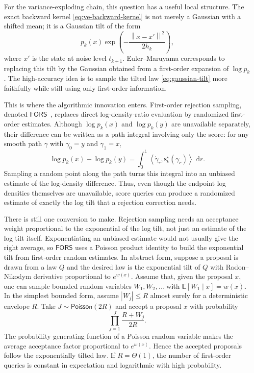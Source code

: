 \documentclass{amsart}
\numberwithin{equation}{section}
\theoremstyle{plain}
\theoremstyle{definition}
\theoremstyle{remark}
\newcommand{\E}{\mathbb{E}}
\newcommand{\dd}{\,\mathrm{d}}
\newcommand{\norm}[1]{\left\lVert #1 \right\rVert}
\newcommand{\ip}[2]{\left\langle #1,#2 \right\rangle}
\newcommand{\sstar}{\mathsf{s}^{\star}}
\newcommand{\Poi}{\mathsf{Poisson}}
\newcommand{\AlgFORS}{\textsf{FORS}}
\begin{document}
For the variance-exploding chain, this question has a useful local structure.
The exact backward kernel \eqref{eq:ve-backward-kernel} is not merely a
Gaussian with a shifted mean; it is a Gaussian tilt of the form
\begin{equation}\label{eq:gaussian-tilt}
    p_k(x)\exp\!\left(-\frac{\norm{x-x'}^2}{2h_k}\right),
\end{equation}
where $x'$ is the state at noise level $t_{k+1}$.  Euler--Maruyama corresponds
to replacing this tilt by the Gaussian obtained from a first-order expansion of
$\log p_k$.  The high-accuracy idea is to sample the tilted law
\eqref{eq:gaussian-tilt} more faithfully while still using only first-order
information.

This is where the algorithmic innovation enters.  First-order rejection
sampling, denoted $\AlgFORS$~\cite{chen2026highaccuracy}, replaces direct
log-density-ratio evaluation by randomized first-order estimates.  Although
$\log p_k(x)$ and $\log p_k(y)$ are unavailable separately, their difference
can be written as a path integral involving only the score: for any smooth path
$\gamma$ with $\gamma_0=y$ and $\gamma_1=x$,
\[
    \log p_k(x)-\log p_k(y)
    =
    \int_0^1
    \ip{\dot\gamma_r}{\sstar_k(\gamma_r)}\,\dd r.
\]
Sampling a random point along the path turns this integral into an unbiased
estimate of the log-density difference.  Thus, even though the endpoint log
densities themselves are unavailable, score queries can produce a randomized
estimate of exactly the log tilt that a rejection correction needs.

There is still one conversion to make.  Rejection sampling needs an acceptance
weight proportional to the exponential of the log tilt, not just an estimate of
the log tilt itself.  Exponentiating an unbiased estimate would not usually
give the right average, so $\AlgFORS$ uses a Poisson product identity to build
the exponential tilt from first-order random estimates.  In abstract form,
suppose a proposal is drawn from a law $Q$ and the desired law is the
exponential tilt of $Q$ with Radon--Nikodym derivative proportional to
$e^{w(x)}$.  Assume that, given the proposal $x$, one can sample bounded random
variables $W_1,W_2,\ldots$ with $\E[W_1\mid x]=w(x)$.  In the simplest bounded
form,
assume $|W_j|\leq R$ almost surely for a deterministic envelope $R$.  Take
$J\sim\Poi(2R)$ and accept a proposal $x$ with probability
\[
    \prod_{j=1}^{J}\frac{R+W_j}{2R}.
\]
The probability generating function of a Poisson random variable makes the
average acceptance factor proportional to $e^{w(x)}$.  Hence the accepted
proposals follow the exponentially tilted law.  If $R=\Theta(1)$, the number of
first-order queries is constant in expectation and logarithmic with high
probability.
\end{document}

